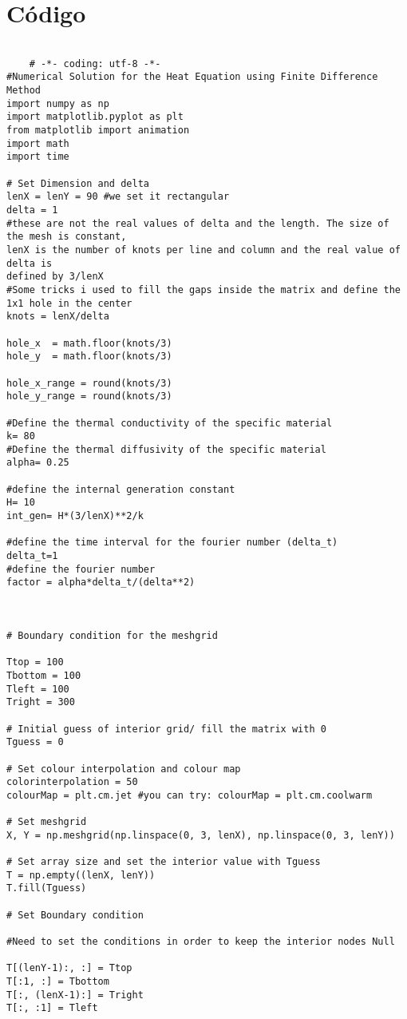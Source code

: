 \documentclass[article]{abntex2}
\begin{document}
\section{Código}
\begin{lstlisting}

    # -*- coding: utf-8 -*-
#Numerical Solution for the Heat Equation using Finite Difference Method
import numpy as np
import matplotlib.pyplot as plt
from matplotlib import animation
import math
import time

# Set Dimension and delta
lenX = lenY = 90 #we set it rectangular 
delta = 1
#these are not the real values of delta and the length. The size of the mesh is constant,
lenX is the number of knots per line and column and the real value of delta is
defined by 3/lenX
#Some tricks i used to fill the gaps inside the matrix and define the 1x1 hole in the center
knots = lenX/delta 

hole_x  = math.floor(knots/3)
hole_y  = math.floor(knots/3)

hole_x_range = round(knots/3)
hole_y_range = round(knots/3)

#Define the thermal conductivity of the specific material
k= 80
#Define the thermal diffusivity of the specific material
alpha= 0.25

#define the internal generation constant
H= 10
int_gen= H*(3/lenX)**2/k 

#define the time interval for the fourier number (delta_t)
delta_t=1
#define the fourier number
factor = alpha*delta_t/(delta**2)



# Boundary condition for the meshgrid 

Ttop = 100
Tbottom = 100
Tleft = 100
Tright = 300

# Initial guess of interior grid/ fill the matrix with 0
Tguess = 0

# Set colour interpolation and colour map
colorinterpolation = 50
colourMap = plt.cm.jet #you can try: colourMap = plt.cm.coolwarm

# Set meshgrid
X, Y = np.meshgrid(np.linspace(0, 3, lenX), np.linspace(0, 3, lenY))

# Set array size and set the interior value with Tguess
T = np.empty((lenX, lenY))
T.fill(Tguess)

# Set Boundary condition 

#Need to set the conditions in order to keep the interior nodes Null

T[(lenY-1):, :] = Ttop
T[:1, :] = Tbottom
T[:, (lenX-1):] = Tright
T[:, :1] = Tleft


\end{lstlisting}
\end{document}
